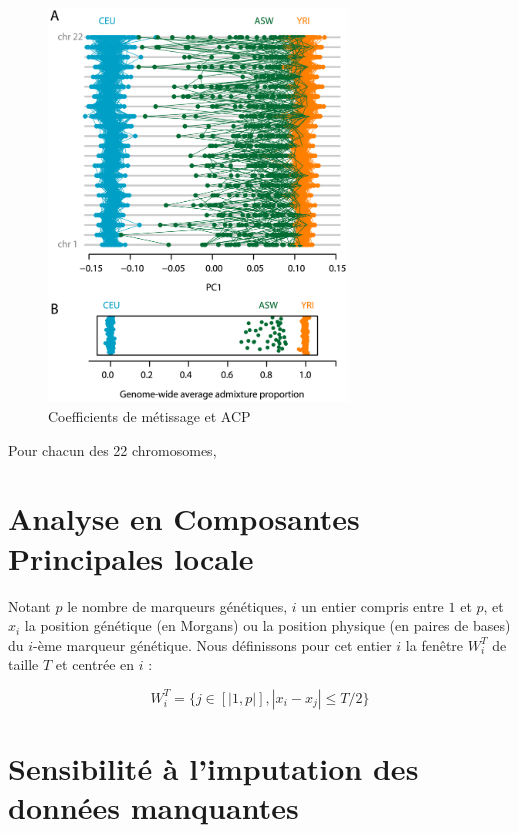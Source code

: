 \documentclass[12pt,twoside]{reedthesis}
\begin{document}
  \begin{figure}
  
  {\centering \includegraphics[width=300px]{figure/mcvean} 
  
  }
  
  \caption{Coefficients de métissage et ACP}\label{fig:mcvean}
  \end{figure}
  
  Pour chacun des 22 chromosomes,
  
  \section{Analyse en Composantes Principales
  locale}\label{analyse-en-composantes-principales-locale}
  
  Notant \(p\) le nombre de marqueurs génétiques, \(i\) un entier compris
  entre \(1\) et \(p\), et \(x_i\) la position génétique (en Morgans) ou
  la position physique (en paires de bases) du \(i\)-ème marqueur
  génétique. Nous définissons pour cet entier \(i\) la fenêtre \(W_i^T\)
  de taille \(T\) et centrée en \(i\) :
  
  \[W_i^T = \{ j \in [|1, p|], |x_i - x_j| \leq T/2 \}\]
  
  \section{Sensibilité à l'imputation des données
  manquantes}\label{sensibilite-a-limputation-des-donnees-manquantes}
  
  \newpage
  
\end{document}
